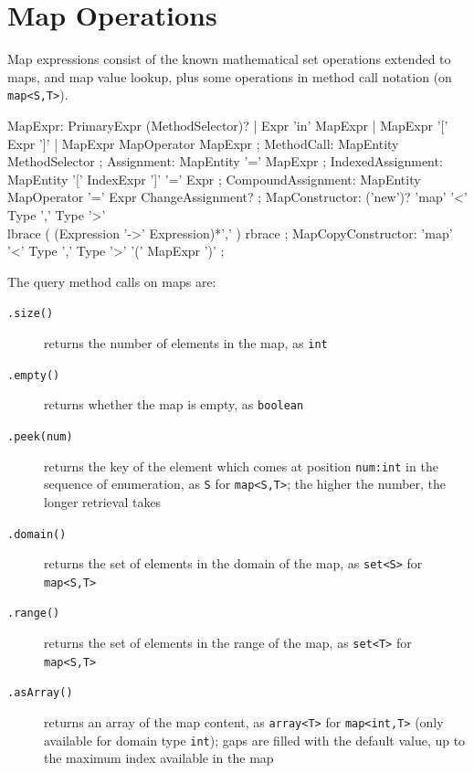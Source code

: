 \section{Map Operations} \label{sec:mapexpr}

Map expressions consist of the known mathematical set operations extended to maps, and map value lookup, plus some operations in method call notation (on \texttt{map<S,T>}).

\begin{rail}
  MapExpr: PrimaryExpr (MethodSelector)? | Expr 'in' MapExpr | MapExpr '[' Expr ']' | MapExpr MapOperator MapExpr ;
  MethodCall: MapEntity MethodSelector ;
  Assignment: MapEntity '=' MapExpr ;
  IndexedAssignment: MapEntity '[' IndexExpr ']' '=' Expr ;
  CompoundAssignment: MapEntity MapOperator '=' Expr ChangeAssignment? ;
  MapConstructor: ('new')? 'map' '<' Type ',' Type '>' \\ lbrace ( (Expression '->' Expression)*',' ) rbrace ;
  MapCopyConstructor: 'map' '<' Type ',' Type '>' '(' MapExpr ')' ;
\end{rail}

\noindent The query method calls on maps are:

\begin{description}
\item[\texttt{.size()}] returns the number of elements in the map, as \texttt{int}
\item[\texttt{.empty()}] returns whether the map is empty, as \texttt{boolean}
\item[\texttt{.peek(num)}] returns the key of the element which comes at position \texttt{num:int} in the sequence of enumeration, as \texttt{S} for \verb#map<S,T>#; the higher the number, the longer retrieval takes
\item[\texttt{.domain()}] returns the set of elements in the domain of the map, as \verb#set<S># for \verb#map<S,T>#
\item[\texttt{.range()}] returns the set of elements in the range of the map, as \verb#set<T># for \verb#map<S,T>#
\item[\texttt{.asArray()}] returns an array of the map content, as \verb#array<T># for \verb#map<int,T># (only available for domain type \texttt{int}); gaps are filled with the default value, up to the maximum index available in the map
\end{description}

